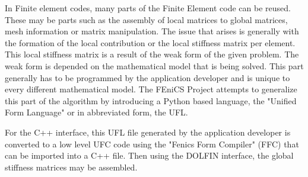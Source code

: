  In Finite element codes, many parts of the Finite Element code can be reused. These may be parts such as the assembly of local matrices to global matrices, mesh information or matrix manipulation. The issue that arises is generally with the formation of the local contribution or the local stiffness matrix per element. This local stiffness matrix is a result of the weak form of the given problem. The weak form is depended on the mathematical model that is being solved. This part generally has to be programmed by the application developer and is unique to every different mathematical model. The FEniCS Project attempts to generalize this part of the algorithm by introducing a Python based language, the "Unified Form Language" or in abbreviated form, the UFL. \cite{ufc_manual}
 
 For the C++ interface, this UFL file generated by the application developer is converted to a low level UFC code using the "Fenics Form Compiler" (FFC) that can be imported into a C++ file. Then using the DOLFIN interface, the global stiffness matrices may be assembled.